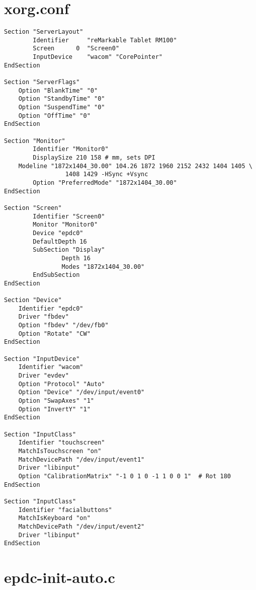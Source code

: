 \documentclass{memoir}
\begin{document}
\chapter{xorg.conf}
\label{xorg.conf}
\begin{verbatim}
Section "ServerLayout"
        Identifier     "reMarkable Tablet RM100"
        Screen      0  "Screen0"
        InputDevice    "wacom" "CorePointer"
EndSection

Section "ServerFlags"
    Option "BlankTime" "0"
    Option "StandbyTime" "0"
    Option "SuspendTime" "0"
    Option "OffTime" "0"
EndSection

Section "Monitor"
        Identifier "Monitor0"
        DisplaySize 210 158 # mm, sets DPI
	Modeline "1872x1404_30.00" 104.26 1872 1960 2152 2432 1404 1405 \
                 1408 1429 -HSync +Vsync
        Option "PreferredMode" "1872x1404_30.00"
EndSection

Section "Screen"
        Identifier "Screen0"
        Monitor "Monitor0"
        Device "epdc0"
        DefaultDepth 16
        SubSection "Display"
                Depth 16
                Modes "1872x1404_30.00"
        EndSubSection
EndSection

Section "Device"
    Identifier "epdc0"
    Driver "fbdev"
    Option "fbdev" "/dev/fb0"
    Option "Rotate" "CW"
EndSection

Section "InputDevice"
    Identifier "wacom"
    Driver "evdev"
    Option "Protocol" "Auto"
    Option "Device" "/dev/input/event0"
    Option "SwapAxes" "1"
    Option "InvertY" "1"
EndSection

Section "InputClass"
    Identifier "touchscreen"
    MatchIsTouchscreen "on"
    MatchDevicePath "/dev/input/event1"
    Driver "libinput"
    Option "CalibrationMatrix" "-1 0 1 0 -1 1 0 0 1"  # Rot 180
EndSection

Section "InputClass"
    Identifier "facialbuttons"
    MatchIsKeyboard "on"
    MatchDevicePath "/dev/input/event2"
    Driver "libinput"
EndSection
\end{verbatim}




\chapter{epdc-init-auto.c}
\label{epdc-init-auto.c}
\end{document}
